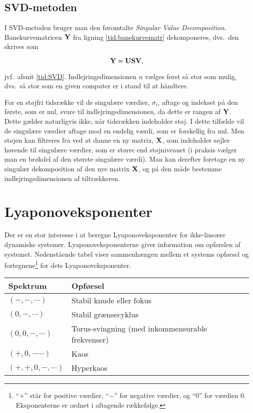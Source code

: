 \newpage
\subsection{SVD-metoden} 
I SVD-metoden bruger man den f{\o}romtalte {\em Singular
Value Decomposition}. Banekurvematricen $\mbox{${\bf Y}$}$ fra
ligning \ref{tid:banekurvematr} dekomponeres, dvs.\ den
skrives som

\begin{equation}
 \mbox{${\bf Y}$} = \mbox{${\bf U}$}\mbox{${\bf S}$}\mbox{${\bf V}$},
\end{equation} 

jvf.\ afsnit \ref{tid:SVD}. Indlejringsdimensionen $n$
v{\ae}lges f{\o}rst s{\aa} stor som mulig, dvs.\ s{\aa}
stor som en given computer er i stand til at h{\aa}ndtere.

\vspace{4.0mm}
For en st{\o}jfri tidsr{\ae}kke vil de singul{\ae}re
v{\ae}rdier, $\sigma_i$, aftage og indekset p{\aa} den
f{\o}rste, som er nul, svare til indlejringsdimensionen,
da dette er rangen af $\mbox{${\bf Y}$}$. Dette g{\ae}lder
naturligvis ikke, n{\aa}r tidsr{\ae}kken indeholder
st{\o}j. I dette tilf{\ae}lde vil de singul{\ae}re
v{\ae}rdier aftage mod en endelig v{\ae}rdi, som er
forskellig fra nul. Men st{\o}jen kan filtreres fra ved at
danne en ny matrix, $\mbox{${\bf X}$}$, som indeholder s{\o}jler
h{\o}rende til singul{\ae}re v{\ae}rdier, som er st{\o}rre
end st{\o}jniveauet (i praksis v{\ae}lger man en br{\o}kdel
af den st{\o}rste singul{\ae}re v{\ae}rdi). Man kan derefter
foretage en ny singul{\ae}r dekomposition af den nye matrix
$\mbox{${\bf X}$}$, og p{\aa} den m{\aa}de bestemme
indlejringsdimensionen af tiltr{\ae}kkeren.

\section{Lyaponoveksponenter}
\label{tid:LCE}
Der er en stor interesse i at beregne Lyaponoveksponenter
for ikke-line{\ae}re dynamiske systemer.
Lyaponoveksponenterne giver information om opf{\o}rslen af
systemet. Nedenst{\aa}ende tabel viser sammenh{\ae}ngen
mellem et systems opf{\o}rsel og fortegnene\footnote{``$+$''
st{\aa}r for positive v{\ae}rdier, ``$-$'' for negative
v{\ae}rdier, og ``0'' for v\ae rdien 0. Eksponenterne er
ordnet i aftagende r{\ae}kkef{\o}lge.} for dets
Lyaponoveksponenter.

\vspace{4.0mm}
\begin{tabular}[h]{ll}
Spektrum         & Opf{\o}rsel  \\ \hline
$(-,-,\cdots )$  & Stabil knude eller fokus \\
$(0,-,\cdots )$  & Stabil gr{\ae}nsecyklus \\
$(0,0,-,\cdots )$ & Torus-svingning (med inkommensurable frekvenser) \\
$(+,0,-\cdots )$ & Kaos \\
$(+,+,0,-,\cdots )$ & Hyperkaos \\ \hline 
\end{tabular} 

